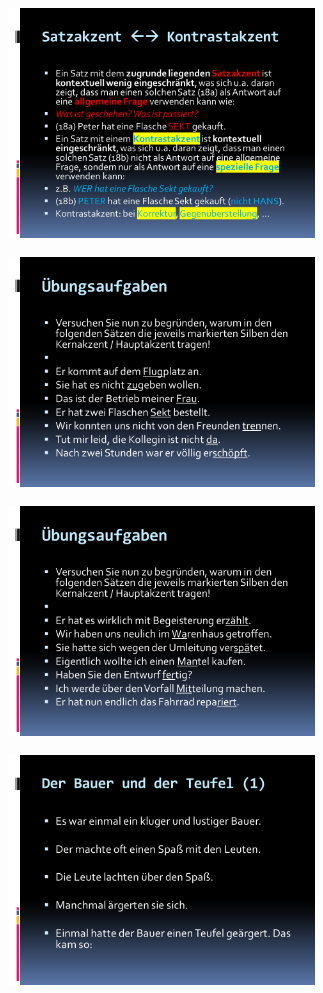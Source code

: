 \documentclass[
  letterpaper,
]{scrbook}
\begin{document}
\includegraphics[width=3.2in,height=\textheight]{./pictures/satzakzentuierung/satzakzent_Diapozitiv6.PNG}

\includegraphics[width=3.2in,height=\textheight]{./pictures/satzakzentuierung/satzakzent_Diapozitiv7.PNG}

\includegraphics[width=3.2in,height=\textheight]{./pictures/satzakzentuierung/satzakzent_Diapozitiv8.PNG}

\includegraphics[width=3.2in,height=\textheight]{./pictures/satzakzentuierung/satzakzent_Diapozitiv9.PNG}
\end{document}

